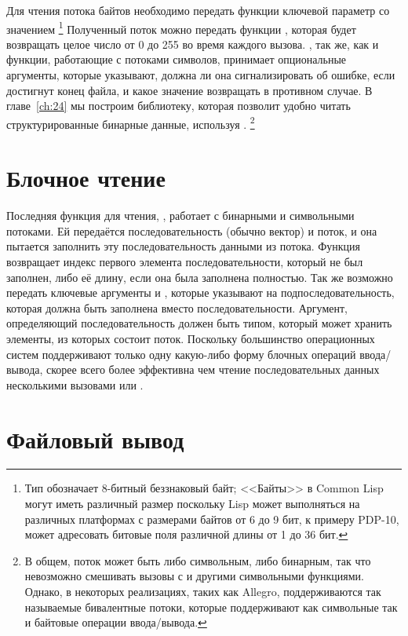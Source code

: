 Для чтения потока байтов необходимо передать функции  ключевой параметр
 со значением  \footnote{Тип
   обозначает 8-битный беззнаковый байт; <<Байты>> в Common Lisp
  могут иметь различный размер поскольку Lisp может выполняться на различных платформах с
  размерами байтов от 6 до 9 бит, к примеру PDP-10, может адресовать битовые поля
  различной длины от 1 до 36 бит.} Полученный поток можно передать функции
, которая будет возвращать целое число от 0 до 255 во время каждого
вызова. , так же, как и функции, работающие с потоками символов, принимает
опциональные аргументы, которые указывают, должна ли она сигнализировать об ошибке, если
достигнут конец файла, и какое значение возвращать в противном случае. В главе~\ref{ch:24}
мы построим библиотеку, которая позволит удобно читать структурированные бинарные данные,
используя . \footnote{В общем, поток может быть либо символьным, либо
  бинарным, так что невозможно смешивать вызовы  с  и
  другими символьными функциями. Однако, в некоторых реализациях, таких как Allegro,
  поддерживаются так называемые бивалентные потоки, которые поддерживают как символьные
так и байтовые операции ввода/вывода.}

\section{Блочное чтение}

Последняя функция для чтения, , работает с бинарными и символьными
потоками. Ей передаётся последовательность (обычно вектор) и поток, и она пытается
заполнить эту последовательность данными из потока. Функция возвращает индекс первого
элемента последовательности, который не был заполнен, либо её длину, если она была
заполнена полностью. Так же возможно передать ключевые аргументы  и
, которые указывают на подпоследовательность, которая должна быть заполнена
вместо последовательности. Аргумент, определяющий последовательность должен быть типом,
который может хранить элементы, из которых состоит поток. Поскольку большинство
операционных систем поддерживают только одну какую-либо форму блочных операций
ввода/вывода,  скорее всего более эффективна чем чтение
последовательных данных несколькими вызовами  или .

\section{Файловый вывод}

